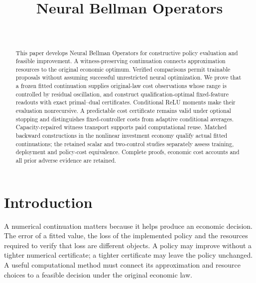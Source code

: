 \documentclass[ecta,nameyear,draft]{econsocart}
\begin{document}
\begin{frontmatter}
\title{Neural Bellman Operators}
\begin{aug}
\author[id=au1,addressref={add1}]{~}
\address[id=add1]{Peking University}
\end{aug}
\begin{abstract}
This paper develops Neural Bellman Operators for constructive policy evaluation and feasible improvement. A witness-preserving continuation connects approximation resources to the original economic optimum. Verified comparisons permit trainable proposals without assuming successful unrestricted neural optimization. We prove that a frozen fitted continuation supplies original-law cost observations whose range is controlled by residual oscillation, and construct qualification-optimal fixed-feature readouts with exact primal--dual certificates. Conditional ReLU moments make their evaluation nonrecursive. A predictable cost certificate remains valid under optional stopping and distinguishes fixed-controller costs from adaptive conditional averages. Capacity-repaired witness transport supports paid computational reuse. Matched backward constructions in the nonlinear investment economy qualify actual fitted continuations; the retained scalar and two-control studies separately assess training, deployment and policy-cost equivalence. Complete proofs, economic cost accounts and all prior adverse evidence are retained.
\end{abstract}
\begin{keyword}
\end{keyword}
\end{frontmatter}
\section{Introduction}\label{sec:introduction65}
A numerical continuation matters because it helps produce an economic decision. The error of a fitted value, the loss of the implemented policy and the resources required to verify that loss are different objects. A policy may improve without a tighter numerical certificate; a tighter certificate may leave the policy unchanged. A useful computational method must connect its approximation and resource choices to a feasible decision under the original economic law.
\end{document}
